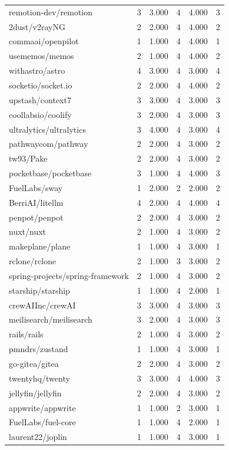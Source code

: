 \begin{tabular}{lrrrrr}
remotion-dev/remotion & 3 & 3.000 & 4 & 4.000 & 3 \\
2dust/v2rayNG & 2 & 2.000 & 4 & 4.000 & 2 \\
commaai/openpilot & 1 & 1.000 & 4 & 4.000 & 1 \\
usememos/memos & 2 & 1.000 & 4 & 4.000 & 2 \\
withastro/astro & 4 & 3.000 & 4 & 3.000 & 4 \\
socketio/socket.io & 2 & 2.000 & 4 & 4.000 & 2 \\
upstash/context7 & 3 & 3.000 & 4 & 3.000 & 3 \\
coollabsio/coolify & 3 & 2.000 & 4 & 3.000 & 3 \\
ultralytics/ultralytics & 3 & 4.000 & 4 & 3.000 & 4 \\
pathwaycom/pathway & 2 & 2.000 & 4 & 3.000 & 2 \\
tw93/Pake & 2 & 2.000 & 4 & 3.000 & 2 \\
pocketbase/pocketbase & 3 & 1.000 & 4 & 4.000 & 3 \\
FuelLabs/sway & 1 & 2.000 & 2 & 2.000 & 2 \\
BerriAI/litellm & 4 & 2.000 & 4 & 4.000 & 4 \\
penpot/penpot & 2 & 2.000 & 4 & 3.000 & 2 \\
nuxt/nuxt & 2 & 1.000 & 4 & 3.000 & 2 \\
makeplane/plane & 1 & 1.000 & 4 & 3.000 & 1 \\
rclone/rclone & 2 & 1.000 & 3 & 3.000 & 2 \\
spring-projects/spring-framework & 2 & 1.000 & 4 & 3.000 & 2 \\
starship/starship & 1 & 1.000 & 4 & 2.000 & 1 \\
crewAIInc/crewAI & 3 & 3.000 & 4 & 3.000 & 3 \\
meilisearch/meilisearch & 3 & 2.000 & 4 & 3.000 & 3 \\
rails/rails & 2 & 1.000 & 4 & 3.000 & 2 \\
pmndrs/zustand & 1 & 1.000 & 4 & 3.000 & 1 \\
go-gitea/gitea & 2 & 2.000 & 4 & 3.000 & 2 \\
twentyhq/twenty & 3 & 3.000 & 4 & 4.000 & 3 \\
jellyfin/jellyfin & 2 & 2.000 & 4 & 3.000 & 2 \\
appwrite/appwrite & 1 & 1.000 & 2 & 3.000 & 1 \\
FuelLabs/fuel-core & 1 & 1.000 & 4 & 2.000 & 1 \\
laurent22/joplin & 1 & 1.000 & 4 & 3.000 & 1 \\

\end{tabular}
